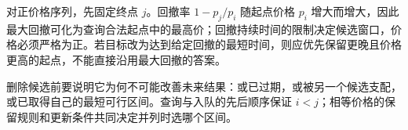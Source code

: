 对正价格序列，先固定终点 $j$。回撤率 $1-p_j/p_i$ 随起点价格 $p_i$ 增大而增大，因此最大回撤可化为查询合法起点中的最高价；回撤持续时间的限制决定候选窗口，价格必须严格为正。若目标改为达到给定回撤的最短时间，则应优先保留更晚且价格更高的起点，不能直接沿用最大回撤的答案。

删除候选前要说明它为何不可能改善未来结果：或已过期，或被另一个候选支配，或已取得自己的最短可行区间。查询与入队的先后顺序保证 $i<j$；相等价格的保留规则和更新条件共同决定并列时选哪个区间。
\par\smallskip
